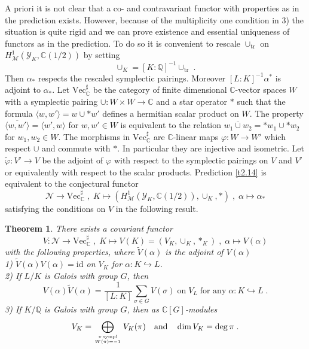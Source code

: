 \documentclass[12pt,leqno]{article}
\newcommand{\C}{{\mathbb{C}}}
\newcommand{\Q}{{\mathbb{Q}}}
\newcommand{\id}{\mathrm{id}}
\newcommand{\tr}{\mathrm{tr}}
\newcommand{\nVec}{\mathrm{Vec}}
\newcommand{\Mh}{{\mathcal M}}
\newcommand{\Nh}{{\mathcal N}}
\newcommand{\Yh}{\mathcal{Y}}
\newcommand{\tvarphi}{\tilde{\varphi}}
\newcommand{\tV}{\tilde{V}}
\newtheorem{theorem}{Theorem}[section]
\begin{document}
A priori it is not clear that a co- and contravariant functor with properties as in the prediction exists. However, because of the multiplicity one condition in 3) the situation is quite rigid and we can prove existence and essential uniqueness of functors as in the prediction. To do so it is convenient to rescale $\cup_{\tr}$ on $H^1_{\Mh} (\Yh_K , \C (1/2))$ by setting 
\[
\cup_K = [K : \Q]^{-1} \cup_{\tr} \; .
\]
Then $\alpha_*$ respects the rescaled symplectic pairings. Moreover $[L : K]^{-1} \alpha^*$ is adjoint to $\alpha_*$. Let $\nVec^{\sharp}_{\C}$ be the category of finite dimensional $\C$-vector spaces $W$ with a symplectic pairing $\cup : W \times W \to \C$ and a star operator $*$ such that the formula $\langle w, w' \rangle = w \cup * w'$ defines a hermitian scalar product on $W$. The property $\langle \overline{w , w'} \rangle = \langle w' , w \rangle$ for $w , w' \in W$ is equivalent to the relation $\overline{w_1 \cup w_2} = * w_1 \cup *w_2$ for $w_1 , w_2 \in W$. The morphisms in $\nVec^{\sharp}_{\C}$ are $\C$-linear maps $\varphi : W \to W'$ which respect $\cup$ and commute with $*$. In particular they are injective and isometric. Let $\tvarphi : V' \to V$ be the adjoint of $\varphi$ with respect to the symplectic pairings on $V$ and $V'$ or equivalently with respect to the scalar products. Prediction \ref{t2.14} is equivalent to the conjectural functor 
\[
\Nh \longrightarrow \nVec^{\sharp}_{\C} \; , \; K \longmapsto (H^1_{\Mh} (\Yh_K , \C (1/2)) , \cup_K , *) \; , \; \alpha \longmapsto \alpha_*
\]
satisfying the conditions on $V$ in the following result.

\begin{theorem}
\label{t2.15}
There exists a covariant functor
\[
V : \Nh \longrightarrow \nVec^{\sharp}_{\C} \; , \; K \longmapsto V (K) = (V_K , \cup_K , *_K) \; , \; \alpha \longmapsto V (\alpha)
\]
with the following properties, where $\tV (\alpha)$ is the adjoint of $V (\alpha)$\\
1) $\tV (\alpha) V (\alpha) = \id$ on $V_K$ for $\alpha : K \hookrightarrow L$.\\
2) If $L / K$ is Galois with group $G$, then
\[
V (\alpha) \tV (\alpha) = \frac{1}{[L : K]} \sum_{\sigma \in G} V (\sigma) \; \text{on} \; V_L \; \text{for any} \; \alpha : K \hookrightarrow L \; .
\]
3) If $K / \Q$ is Galois with group $G$, then as $\C [G]$-modules
\begin{equation} \label{eq:11n}
V_K = \bigoplus_{\pi \, \text{sympl}\atop W (\pi) = -1} V_K (\pi) \quad \text{and} \quad \dim V_K = \deg \pi \; .
\end{equation}
\end{theorem}
\end{document}
